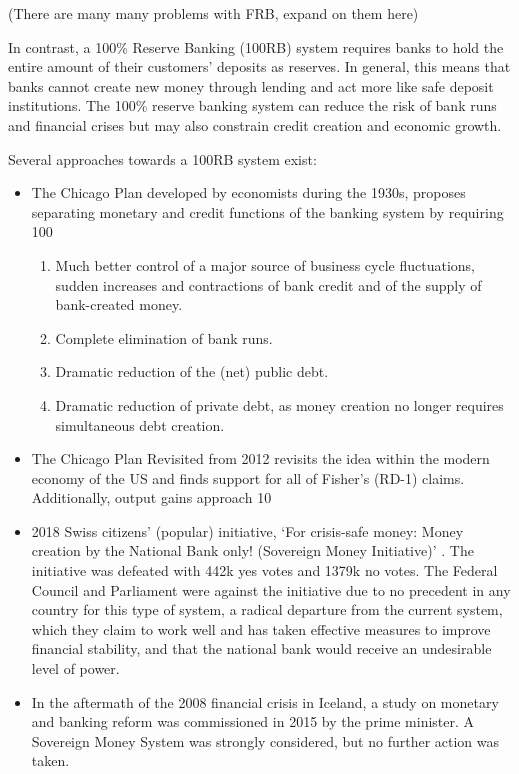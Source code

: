 \documentclass{article}
\begin{document}
(There are many many problems with FRB, expand on them here)

In contrast, a 100\% Reserve Banking (100RB) system requires banks to hold the entire amount of their customers' deposits as reserves. In general, this means that banks cannot create new money through lending and act more like safe deposit institutions. The 100\% reserve banking system can reduce the risk of bank runs and financial crises but may also constrain credit creation and economic growth. 

Several approaches towards a 100RB system exist:

\begin{itemize}
    \item The Chicago Plan \cite{fisher1936} developed by economists during the 1930s, proposes separating monetary and credit functions of the banking system by requiring 100%
    \begin{enumerate}
        \item Much better control of a major source of business cycle fluctuations, sudden increases and contractions of bank credit and of the supply of bank-created money.
        \item Complete elimination of bank runs.
        \item Dramatic reduction of the (net) public debt.
        \item Dramatic reduction of private debt, as money creation no longer requires simultaneous debt creation.
        \end{enumerate}
        \item The Chicago Plan Revisited \cite{ChicagoRevisited} from 2012 revisits the idea within the modern economy of the US and finds support for all of Fisher's (RD-1) claims. Additionally, output gains approach 10%
        \item 2018 Swiss citizens’ (popular) initiative, ‘For crisis-safe money: Money creation by the National Bank only! (Sovereign Money Initiative)’ \cite{SwizzInitiative}. The initiative was defeated with 442k yes votes and 1379k no votes. The Federal Council and Parliament were against the initiative due to no precedent in any country for this type of system, a radical departure from the current system, which they claim to work well and has taken effective measures to improve financial stability, and that the national bank would receive an undesirable level of power.
        \item In the aftermath of the 2008 financial crisis in Iceland, a study on monetary and banking reform \cite{IcelandReport} was commissioned in 2015 by the prime minister. A Sovereign Money System was strongly considered, but no further action was taken.
\end{itemize}



\end{document}
